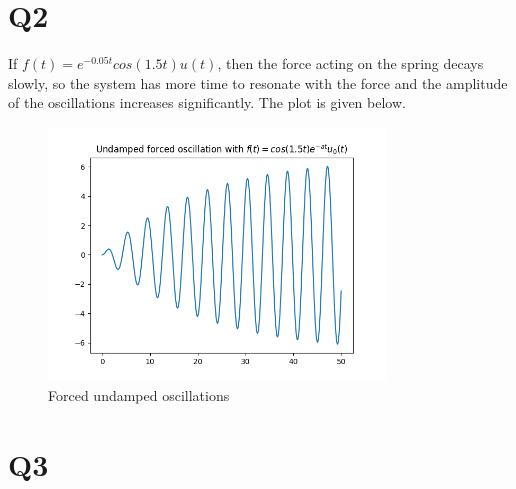 \documentclass[12pt, a4paper]{article}
\begin{document}
\section{Q2}

If $f(t) = e^{-0.05t}cos(1.5t)u(t)$, then the force acting on the spring decays slowly, so the system has more time to resonate with the force and the amplitude of the oscillations increases significantly. The plot is given below.
\begin{figure}[H]
\centering
\includegraphics[width=0.8\textwidth]{Figure_2.png}
\caption{Forced undamped oscillations}
\end{figure}


\section{Q3}
\end{document}
